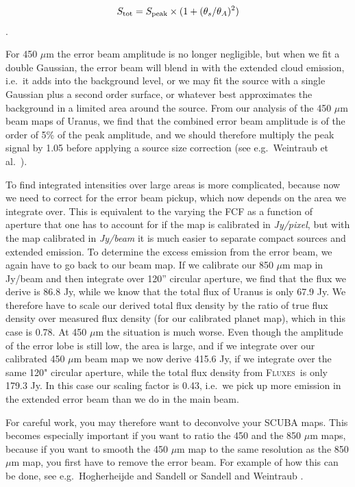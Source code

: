 \documentclass[twoside,11pt]{article}
\newcommand{\fluxes}{\xref{\textsc{Fluxes}}{sun213}{}}
\newcommand{\xref}[3]{#1}
\renewcommand{\_}{\texttt{\symbol{95}}}
\begin{document}
\begin{equation}
S_{\rm tot} = S_{\rm peak} \times (1 +(\theta_{s}/\theta_{A})^2)   \end{equation}.

For 450 $\mu$m the error beam amplitude is no longer negligible, but
when we fit a double Gaussian, the error beam will blend in with the
extended cloud emission, i.e.\ it adds into the background level, or we
may fit the source with a single Gaussian plus a second order surface,
or whatever best approximates the background in a limited area around
the source.  From our analysis of the 450 $\mu$m beam maps of Uranus,
we find that the combined error beam amplitude is of the order of 5\%
of the peak amplitude, and we should therefore multiply the peak
signal by 1.05 before applying a source size correction (see e.g.\
Weintraub et al.\  \cite{Weintraub99}).


To find integrated intensities over large areas is more complicated,
because now we need to correct for the error beam pickup, which now
depends on the area we integrate over.  This is equivalent to the
varying the FCF as a function of aperture that one has to account for
if the map is calibrated in {\it Jy/pixel}, but with the map
calibrated in {\it Jy/beam} it is much easier to separate compact
sources and extended emission.  To determine the excess emission from
the error beam, we again have to go back to our beam map.  If we
calibrate our 850 $\mu$m map in Jy/beam and then integrate over 120''
circular aperture, we find that the flux we derive is 86.8 Jy, while
we know that the total flux of Uranus is only 67.9 Jy.  We therefore
have to scale our derived total flux density by the ratio of true flux
density over measured flux density (for our calibrated planet map),
which in this case is 0.78.  At 450 $\mu$m the situation is much
worse.  Even though the amplitude of the error lobe is still low, the
area is large, and if we integrate over our calibrated 450 $\mu$m beam
map we now derive 415.6 Jy, if we integrate over the same 120"
circular aperture, while the total flux density from \fluxes\ is only
179.3 Jy.  In this case our scaling factor is 0.43, i.e.\ we pick up
more emission in the extended error beam than we do in the main beam.

For careful work, you may therefore want to deconvolve your SCUBA
maps.  This becomes especially important if you want to ratio the 450
and the 850 $\mu$m maps, because if you want to smooth the 450 $\mu$m
map to the same resolution as the 850 $\mu$m map, you first have to
remove the error beam.  For example of how this can be done, see e.g.\
Hogherheijde and Sandell \cite{Hogherheijde00} or Sandell and
Weintraub \cite{Sandell01}.
\end{document}
